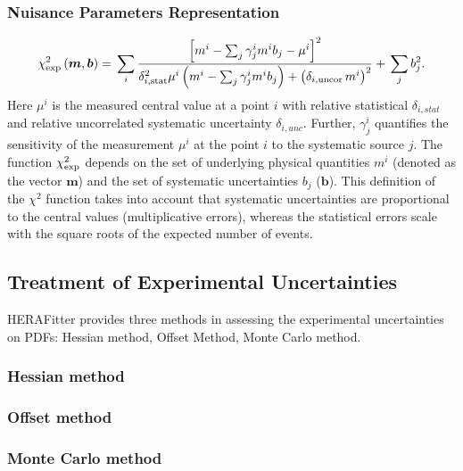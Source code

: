 \subsubsection{Nuisance Parameters Representation}

%
\begin{equation}
 \chi^2_{\rm exp}\left(\boldsymbol{m},\boldsymbol{b}\right) = \\
 \sum_i
 \frac{\left[m^i
- \sum_j \gamma^i_j m^i b_j  - {\mu^i} \right]^2}
{ \textstyle \delta^2_{i,{\rm stat}}\mu^i \left(m^i -  \sum_j \gamma^i_j m^i b_j\right)+
\left(\delta_{i,{\rm uncor}}\,  m^i\right)^2} 
 + \\ \sum_j b^2_j.
\label{eq:aven}\end{equation}
%
Here ${\mu^i}$ is the  measured central value  at a point $i$ 
with  relative statistical $\delta_{i,stat}$ 
and relative uncorrelated systematic uncertainty $\delta_{i,unc}$.
Further, 
$\gamma^i_j$ 
quantifies the sensitivity of the
measurement ${\mu^i}$ at the point $i$ to the systematic source $j$. 
The function $\chi^2_{\rm exp}$ depends on the set of
underlying physical quantities $m^i$ 
(denoted as the vector $\boldsymbol{m}$) and 
 the set of systematic uncertainties $b_j$ ($\boldsymbol{b}$).
This definition of the $\chi^2$ function takes into account that
systematic uncertainties are proportional to the central values 
(multiplicative errors), whereas the statistical errors scale 
with the square roots of the expected number of events. 


\subsection{Treatment of Experimental Uncertainties}

HERAFitter provides three methods in assessing the experimental uncertainties on PDFs: Hessian method, Offset Method, Monte Carlo method.

\subsubsection{Hessian method}
\subsubsection{Offset  method}
\subsubsection{Monte Carlo method}



